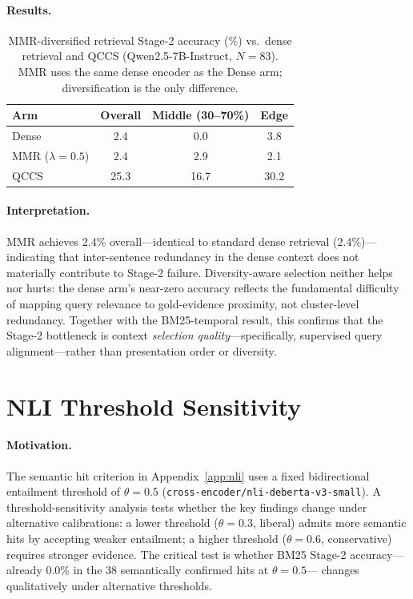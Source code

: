 \documentclass{article}
\begin{document}
\paragraph{Results.}

\begin{table}[H]
\centering
\caption{MMR-diversified retrieval Stage-2 accuracy (\%) vs.\ dense retrieval
  and QCCS (Qwen2.5-7B-Instruct, $N{=}83$).
  MMR uses the same dense encoder as the Dense arm; diversification is the
  only difference.}
\label{tab:mmr}
\small
\begin{tabular}{@{}lccc@{}}
\toprule
Arm & Overall & Middle (30--70\%) & Edge \\
\midrule
Dense                    & 2.4  & 0.0  & 3.8  \\
MMR ($\lambda{=}0.5$)    & 2.4  & 2.9  & 2.1  \\
QCCS                     & 25.3 & 16.7 & 30.2 \\
\bottomrule
\end{tabular}
\end{table}

\paragraph{Interpretation.}
MMR achieves 2.4\% overall---identical to standard dense retrieval (2.4\%)---
indicating that inter-sentence redundancy in the dense context does not
materially contribute to Stage-2 failure. Diversity-aware selection neither
helps nor hurts: the dense arm's near-zero accuracy reflects the fundamental
difficulty of mapping query relevance to gold-evidence proximity, not
cluster-level redundancy. Together with the BM25-temporal result, this confirms
that the Stage-2 bottleneck is context \emph{selection quality}---specifically,
supervised query alignment---rather than presentation order or diversity.



\section{NLI Threshold Sensitivity}
\label{app:nli_thresh}

\paragraph{Motivation.}
The semantic hit criterion in Appendix~\ref{app:nli} uses a fixed bidirectional
entailment threshold of $\theta = 0.5$ (\texttt{cross-encoder/nli-deberta-v3-small}).
A threshold-sensitivity analysis tests whether the key findings change under
alternative calibrations: a lower threshold ($\theta = 0.3$, liberal) admits
more semantic hits by accepting weaker entailment; a higher threshold ($\theta = 0.6$,
conservative) requires stronger evidence. The critical test is whether BM25
Stage-2 accuracy---already 0.0\% in the 38 semantically confirmed hits at $\theta = 0.5$---
changes qualitatively under alternative thresholds.
\end{document}
